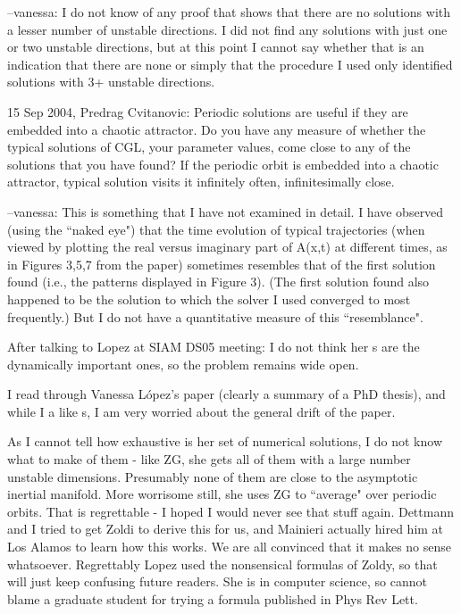 --vanessa:
I do not know of any proof that shows that there are no solutions with a
lesser number of unstable directions.  I did not find any solutions with
just one or two unstable directions, but at this point I cannot say
whether that is an indication that there are none or simply that
the procedure I used only identified solutions with 3+ unstable
directions.

15 Sep 2004, Predrag Cvitanovic:
Periodic solutions are useful if they are embedded into a chaotic
attractor. Do you have any measure of whether the typical solutions of
CGL, your parameter values, come close to any of the solutions that you
have found? If the periodic orbit is embedded into a chaotic attractor,
typical solution visits it infinitely often, infinitesimally close.

--vanessa:
This is something that I have not examined in detail.  I have observed (using
the ``naked eye") that the time evolution of typical trajectories (when viewed
by plotting the real versus imaginary part of A(x,t) at different times, as in
Figures 3,5,7 from the paper) sometimes resembles that of the first solution
found (i.e., the patterns displayed in Figure 3). (The first solution
found also happened to be the solution to which the solver I used
converged to most frequently.)  But I do not have a
quantitative measure of this ``resemblance".

After talking to Lopez at SIAM DS05 meeting: I do not think
her \rpo s are the dynamically important ones, so the problem remains wide open.

I read through
Vanessa L{\'o}pez's paper (clearly a summary of a PhD thesis), and while I
a like {\rpo s}, I am very worried about the general drift
of the paper.

As I cannot tell how exhaustive is her set of numerical solutions, I do
not know what to make of them - like ZG, she gets all of them with a large
number unstable dimensions. Presumably none of them are close to the
asymptotic inertial manifold. More worrisome still, she uses ZG to
``average" over periodic orbits. That is regrettable - I hoped I would
never see that stuff again. Dettmann and I tried to get Zoldi to
derive this for us, and Mainieri actually hired him at Los Alamos to learn
how this works. We are all convinced that it makes no sense whatsoever.
Regrettably Lopez used the nonsensical formulas of Zoldy, so that will
just keep confusing future readers.
She is in computer science, so cannot
blame a graduate student for trying a formula published in Phys Rev Lett.

